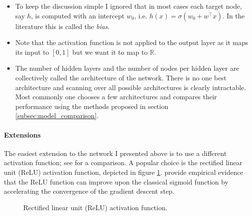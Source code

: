 \begin{remark}\hfill
    \begin{itemize}
        \item  To keep the discussion simple I ignored that in most cases each target
            node, say $h$, is computed with an intercept $w_0$, i.e. $h(x) = \sigma(w_0 +
            w^\top x)$. In the literature this is called the \emph{bias}.
        \item Note that the activation function is not applied to the output layer
            as it maps its input to $[0, 1]$ but we want it to map to $\mathbb{R}$.
        \item The number of hidden layers and the number of nodes per hidden layer are
            collectively called the architecture of the network. There is no one best
            architecture and scanning over all possible architectures is clearly
            intractable. Most commonly one chooses a few architectures and compares
            their performance using the methods proposed in section
            \ref{subsec:model_comparison}.
    \end{itemize}
\end{remark}

\paragraph{Extensions}

The easiest extension to the network I presented above is to use a different activation
function; see \cite{Hara.1994} for a comparison. A popular choice is the rectified
linear unit (ReLU) activation function, depicted in figure \ref{fig:relu_function}.
\cite{Hinton.2017} provide empirical evidence that the ReLU function can improve upon
the classical sigmoid function by accelerating the convergence of the gradient descent
step.

\begin{figure}[!ht]
\centering
{}
\caption{Rectified linear unit (ReLU) activation function.}\label{fig:relu_function}
\end{figure}
